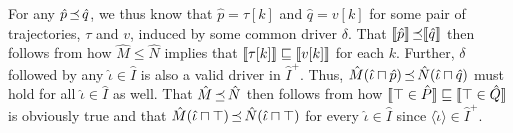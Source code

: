\noindent For any $\hat p \operatorname{\mathrel{\preceq}} \hat q$, we thus know that $\hat p = \tau[k]$ and $\hat q = v[k]$ for some pair of trajectories, $\tau$ and $v$, induced by some common driver $\delta$. That $\llbracket\hat p\rrbracket \operatorname{\mathrel{\preceq}} \llbracket\hat q\rrbracket$ then follows from how $\hat M \leq \hat N$ implies that $\llbracket\tau[k]\rrbracket \sqsubseteq \llbracket v[k]\rrbracket$ for each $k$. Further, $\delta$ followed by any $\hat \iota \in \hat I$ is also a valid driver in $\hat I^{+}$. Thus, $\hat M(\hat \iota \sqcap \hat p) \operatorname{\mathrel{\preceq}} \hat N(\hat \iota \sqcap \hat q)$ must hold for all $\hat \iota \in \hat I$ as well. That $\hat M \operatorname{\mathrel{\preceq}} \hat N$ then follows from how $\llbracket\top \in \hat P\rrbracket \sqsubseteq \llbracket\top \in \hat Q\rrbracket$ is obviously true and that $\hat M(\hat \iota \sqcap \top) \operatorname{\mathrel{\preceq}} \hat N(\hat \iota \sqcap \top)$ for every $\hat \iota \in \hat I$ since $\langle \hat \iota \rangle \in \hat I^{+}$.



